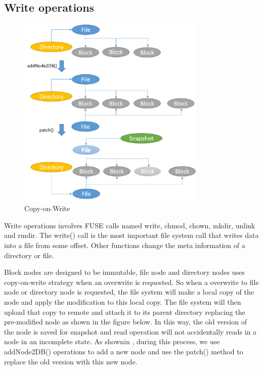 \subsection{Write operations}

\begin{figure}[hbtp]
\centering
\includegraphics[width=0.8\textwidth]{Chapter-3/figs/fig10.png}
\caption{Copy-on-Write}
\label{fig:cow}
\end{figure}

    Write operations involves FUSE calls named write, chmod, chown, mkdir, unlink and rmdir. The write() call is the most important file system call that writes data into a file from some offset. Other functions change the meta information of a directory or file.

    Block nodes are designed to be immutable, file node and directory nodes uses copy-on-write strategy when an overwrite is requested. So when a overwrite to file node or directory node is requested, the file system will make a local copy of the node and apply the modification to this local copy. The file system will then upload that copy to remote and attach it to its parent directory replacing the pre-modified node as shown in the figure below. In this way, the old version of the node is saved for snapshot and read operation will not accidentally reads in a node in an incomplete state. As shownin , during this process, we use addNode2DB() operations to add a new node and use the patch() method to replace the old version with this new node.

